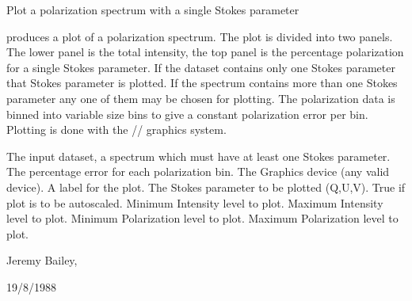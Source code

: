 \begin{manroutinedescription}
        Plot a polarization spectrum with a single Stokes parameter

        {} produces a plot of a polarization spectrum. The plot is
        divided into two panels. The lower panel is the total intensity,
        the top panel is the percentage polarization for a single Stokes
        parameter. If the dataset contains only one Stokes parameter that
        Stokes parameter is plotted. If the spectrum contains more than
        one Stokes parameter any one of them may be chosen for plotting.
        The polarization data is binned into variable size bins to give
        a constant polarization error per bin. Plotting is done with the
        {}/{}/{} graphics system.

\begin{manparametertable}
  The input %
dataset, a spectrum which must
                               have at least one Stokes parameter.
     The percentage error for %
each polarization
                               bin.
   The Graphics device (any %
valid {} device).
     A label for the plot.
     The Stokes parameter to be %
plotted (Q,U,V).
  True if plot is to be autoscaled.
     Minimum Intensity level to plot.
     Maximum Intensity level to plot.
     Minimum Polarization level to %
plot.
     Maximum Polarization level to %
plot.

\end{manparametertable}
         Jeremy Bailey, {}

         19/8/1988

\end{manroutinedescription}
